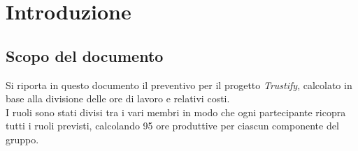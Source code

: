 \section{Introduzione}
\subsection{Scopo del documento}
Si riporta in questo documento il preventivo per il progetto \textit{Trustify}, calcolato in base alla divisione delle ore di lavoro e relativi costi. \\
I ruoli sono stati divisi tra i vari membri in modo che ogni partecipante ricopra tutti i ruoli previsti, calcolando 95 ore produttive per ciascun componente del gruppo.
